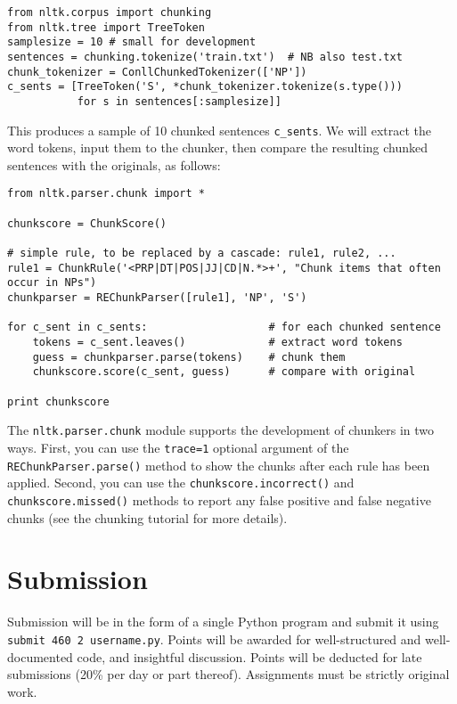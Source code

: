\documentclass{460}
\begin{document}
\begin{verbatim}
from nltk.corpus import chunking
from nltk.tree import TreeToken
samplesize = 10 # small for development
sentences = chunking.tokenize('train.txt')  # NB also test.txt
chunk_tokenizer = ConllChunkedTokenizer(['NP'])
c_sents = [TreeToken('S', *chunk_tokenizer.tokenize(s.type()))
           for s in sentences[:samplesize]]
\end{verbatim}

This produces a sample of 10 chunked sentences \texttt{c\_sents}.  We will
extract the word tokens, input them to the chunker, then compare the resulting
chunked sentences with the originals, as follows:

\begin{verbatim}
from nltk.parser.chunk import *

chunkscore = ChunkScore()

# simple rule, to be replaced by a cascade: rule1, rule2, ...
rule1 = ChunkRule('<PRP|DT|POS|JJ|CD|N.*>+', "Chunk items that often occur in NPs")
chunkparser = REChunkParser([rule1], 'NP', 'S')

for c_sent in c_sents:                   # for each chunked sentence
    tokens = c_sent.leaves()             # extract word tokens
    guess = chunkparser.parse(tokens)    # chunk them
    chunkscore.score(c_sent, guess)      # compare with original

print chunkscore
\end{verbatim}

The \texttt{nltk.parser.chunk} module supports the development of
chunkers in two ways.  First, you can use the \texttt{trace=1}
optional argument of the \texttt{REChunkParser.parse()} method to
show the chunks after each rule has been applied.  Second, you can use
the \texttt{chunkscore.incorrect()} and \texttt{chunkscore.missed()}
methods to report any false positive and false negative chunks
(see the chunking tutorial for more details).

\section*{Submission}

Submission will be in the form of a single Python program and submit
it using \texttt{submit 460 2 username.py}.
Points will be awarded for well-structured and
well-documented code, and insightful discussion.  Points will be
deducted for late submissions (20\% per day or part thereof).
Assignments must be strictly original work.
\end{document}
